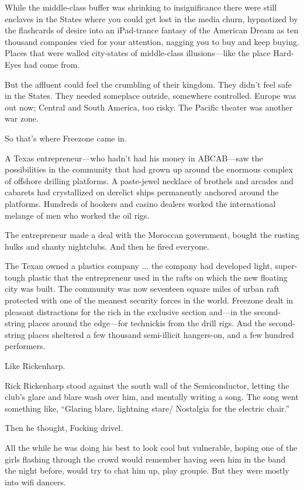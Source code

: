 While the middle-class buffer was shrinking to insignificance there were still enclaves in the States where you could get lost in the media churn, hypnotized by the flashcards of desire into an iPad-trance fantasy of the American Dream as ten thousand companies vied for your attention, nagging you to buy and keep buying. Places that were walled city-states of middle-class illusions---like the place Hard-Eyes had come from.

But the affluent could feel the crumbling of their kingdom. They didn't feel safe in the States. They needed someplace outside, somewhere controlled. Europe was out now; Central and South America, too risky. The Pacific theater was another war zone.

So that's where Freezone came in.

A Texas entrepreneur---who hadn't had his money in ABCAB---saw the possibilities in the community that had grown up around the enormous complex of offshore drilling platforms. A paste-jewel necklace of brothels and arcades and cabarets had crystallized on derelict ships permanently anchored around the platforms. Hundreds of hookers and casino dealers worked the international melange of men who worked the oil rigs.

The entrepreneur made a deal with the Moroccan government, bought the rusting hulks and shanty nightclubs. And then he fired everyone.

The Texan owned a plastics company ... the company had developed light, super-tough plastic that the entrepreneur used in the rafts on which the new floating city was built. The community was now seventeen square miles of urban raft protected with one of the meanest security forces in the world. Freezone dealt in pleasant distractions for the rich in the exclusive section and---in the second-string places around the edge---for technickis from the drill rigs. And the second-string places sheltered a few thousand semi-illicit hangers-on, and a few hundred performers.

Like Rickenharp.

Rick Rickenharp stood against the south wall of the Semiconductor, letting the club's glare and blare wash over him, and mentally writing a song. The song went something like, ``Glaring blare, lightning stare/ Nostalgia for the electric chair.''

Then he thought, Fucking drivel.

All the while he was doing his best to look cool but vulnerable, hoping one of the girls flashing through the crowd would remember having seen him in the band the night before, would try to chat him up, play groupie. But they were mostly into wifi dancers.

